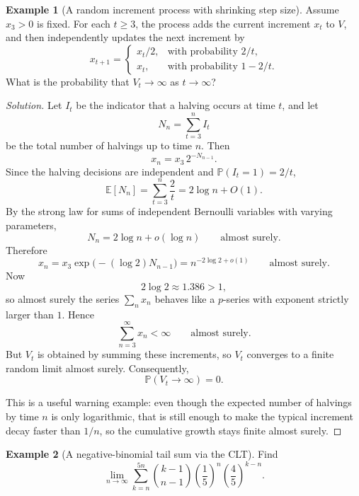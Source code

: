 \documentclass[11pt]{article}
\theoremstyle{definition}
\newtheorem{example}{Example}[section]
\newcommand{\E}{\mathbb{E}}
\begin{document}
\begin{example}[A random increment process with shrinking step size]
Assume $x_3>0$ is fixed. For each $t\ge 3$, the process adds the current increment $x_t$ to $V$, and then independently updates the next increment by
\[
x_{t+1}=
\begin{cases}
x_t/2, & \text{with probability } 2/t,\\
x_t, & \text{with probability } 1-2/t.
\end{cases}
\]
What is the probability that $V_t\to\infty$ as $t\to\infty$?
\end{example}

\begin{proof}[Solution]
Let $I_t$ be the indicator that a halving occurs at time $t$, and let
\[
N_n=\sum_{t=3}^n I_t
\]
be the total number of halvings up to time $n$. Then
\[
x_n = x_3\,2^{-N_{n-1}}.
\]
Since the halving decisions are independent and $\mathbb{P}(I_t=1)=2/t$,
\[
\E[N_n]=\sum_{t=3}^n \frac{2}{t}=2\log n + O(1).
\]
By the strong law for sums of independent Bernoulli variables with varying parameters,
\[
N_n = 2\log n + o(\log n) \qquad \text{almost surely}.
\]
Therefore
\[
x_n = x_3\exp\bigl(- (\log 2)N_{n-1}\bigr)
= n^{-2\log 2 + o(1)} \qquad \text{almost surely}.
\]
Now
\[
2\log 2 \approx 1.386 > 1,
\]
so almost surely the series $\sum_n x_n$ behaves like a $p$-series with exponent strictly larger than $1$. Hence
\[
\sum_{n=3}^{\infty} x_n < \infty \qquad \text{almost surely}.
\]
But $V_t$ is obtained by summing these increments, so $V_t$ converges to a finite random limit almost surely. Consequently,
\[
\boxed{\mathbb{P}(V_t\to\infty)=0}.
\]

This is a useful warning example: even though the expected number of halvings by time $n$ is only logarithmic, that is still enough to make the typical increment decay faster than $1/n$, so the cumulative growth stays finite almost surely.
\end{proof}

\begin{example}[A negative-binomial tail sum via the CLT]
Find
\[
\lim_{n\to\infty}\sum_{k=n}^{5n} \binom{k-1}{n-1}\left(\frac15\right)^n\left(\frac45\right)^{k-n}.
\]
\end{example}
\end{document}
